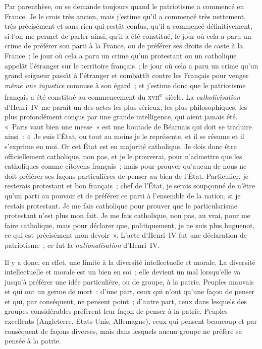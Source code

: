 \documentclass[french,twoside]{book} %
\begin{document}
Par parenthèse, on se demande toujours quand le patriotisme a commencé en France. Je le crois très ancien, mais j’estime qu’il a commencé très nettement, très précisément et sans rien qui restât confus, qu’il a commencé définitivement, si l’on me permet de parler ainsi, qu’il a été constitué, le jour où cela a paru un crime de préférer son parti à la France, ou de préférer ses droits de caste à la France ; le jour où cela a paru un crime qu’un protestant ou un catholique appelât l’étranger sur le territoire français ; le jour où cela a paru un crime qu’un grand seigneur passât à l’étranger et combattît contre les Français pour venger {\itshape même une injustice} commise à son égard ; et j’estime donc que le patriotisme français a été constitué au commencement du \textsc{xvii}\textsuperscript{e} siècle. La {\itshape catholicisation} d’Henri IV me paraît un des actes les plus sérieux, les plus philosophiques, les plus profondément conçus par une grande intelligence, qui aient jamais été. « Paris vaut bien une messe » est une  boutade de Béarnais qui doit se traduire ainsi : « Je suis l’État, ou tout au moins je le représente, et il se résume et il s’exprime en moi. Or cet État est en majorité catholique. Je dois donc être officiellement catholique, non pas, et je le prouverai, pour n’admettre que les catholiques comme citoyens français ; mais pour prouver qu’aucun de nous ne doit préférer ses façons particulières de penser au bien de l’État. Particulier, je resterais protestant et bon français ; chef de l’État, je serais soupçonné de n’être qu’un parti au pouvoir et de préférer ce parti à l’ensemble de la nation, si je restais protestant. Je me fais catholique pour prouver que le particularisme protestant n’est plus mon fait. Je me fais catholique, non pas, au vrai, pour me faire catholique, mais pour déclarer que, politiquement, je ne suis plus huguenot, ce qui est précisément mon devoir ». L’acte d’Henri IV fut une déclaration de patriotisme ; ce fut la {\itshape nationalisation} d’Henri IV.\par
Il y a donc, en effet, une limite à la diversité intellectuelle et morale. La diversité intellectuelle et morale est un bien en soi ; elle devient un mal lorsqu’elle va jusqu’à préférer une idée particulière, ou de groupe, à la patrie. Peuples mauvais et qui ont un germe de mort : d’une part, ceux qui n’ont qu’une façon de penser et qui, par conséquent,  ne pensent point ; d’autre part, ceux dans lesquels des groupes considérables préfèrent leur façon de penser à la patrie. Peuples excellents (Angleterre, États-Unis, Allemagne), ceux qui pensent beaucoup et par conséquent de façons diverses, mais dans lesquels aucun groupe ne préfère sa pensée à la patrie.\par
\end{document}
